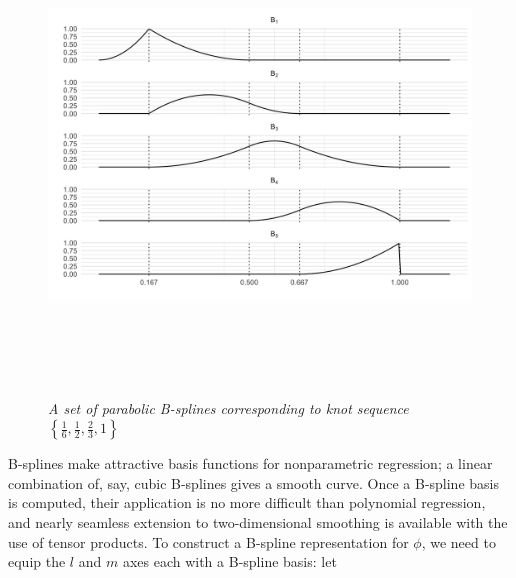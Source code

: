 \begin{figure}[H]
  \centering
  \includegraphics[width=5in,height=5in]{img/deboor_parabolic_bsplines}
  \caption{\textit{A set of parabolic B-splines corresponding to knot sequence  $\left\{\frac{1}{6}, \frac{1}{2}, \frac{2}{3}, 1\right\}$ }}\label{fig:parabolic-Bspline-basis}
\end{figure}


B-splines make attractive basis functions for nonparametric regression; a linear combination of, say, cubic B-splines gives a smooth curve. Once a B-spline basis is computed, their application is no more difficult than polynomial regression, and nearly seamless extension to two-dimensional smoothing is available with the use of tensor products. To construct a B-spline representation for $\phi$, we need to equip the $l$ and $m$ axes each with a B-spline basis: let


